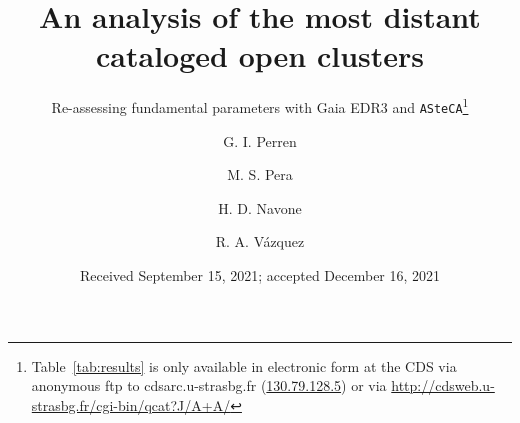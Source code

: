 \documentclass{aa}
\begin{document}
 


\title{An analysis of the most distant cataloged open clusters}
\subtitle{Re-assessing fundamental parameters with Gaia EDR3 and
\texttt{ASteCA}\thanks{
Table~\ref{tab:results} is only available in electronic form
at the CDS via anonymous ftp to cdsarc.u-strasbg.fr (\url{130.79.128.5})
or via \url{http://cdsweb.u-strasbg.fr/cgi-bin/qcat?J/A+A/}}}

\author{G. I. Perren
      \and
      M. S. Pera
      \and
      H. D. Navone
      \and
      R. A. Vázquez
}

\date{Received September 15, 2021; accepted December 16, 2021}

 
\end{document}
